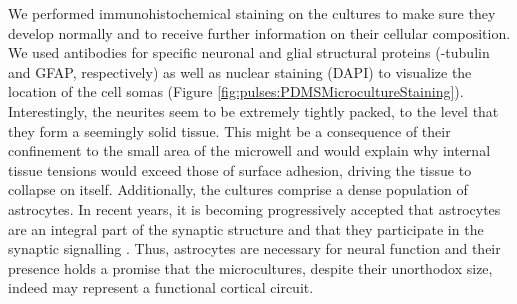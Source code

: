    We performed immunohistochemical staining on the cultures to make sure they develop normally and to receive further information on their cellular composition. We used antibodies for specific neuronal and glial structural proteins (\textbeta -tubulin and GFAP, respectively) as well as nuclear staining (DAPI) to visualize the location of the cell somas (Figure \ref{fig:pulses:PDMSMicrocultureStaining}). Interestingly, the neurites seem to be extremely tightly packed, to the level that they form a seemingly solid tissue. This might be a consequence of their confinement to the small area of the microwell and would explain why internal tissue tensions would exceed those of surface adhesion, driving the tissue to collapse on itself. Additionally, the cultures comprise a dense population of astrocytes. In recent years, it is becoming progressively accepted that astrocytes are an integral part of the synaptic structure and that they participate in the synaptic signalling \cite{araque1999tripartite}. Thus, astrocytes are necessary for neural function and their presence holds a promise that the microcultures, despite their unorthodox size, indeed may represent a functional cortical circuit.

